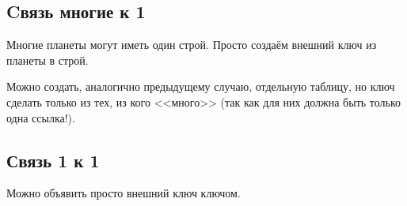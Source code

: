 \subsection{Cвязь многие к 1}

Многие планеты могут иметь один строй. Просто создаём внешний ключ из планеты в строй.

Можно создать, аналогично предыдущему случаю, отдельную таблицу, но ключ сделать только из тех, из кого <<много>>
(так как для них должна быть только одна ссылка!).

\subsection{Связь 1 к 1}

Можно объявить просто внешний ключ ключом.
